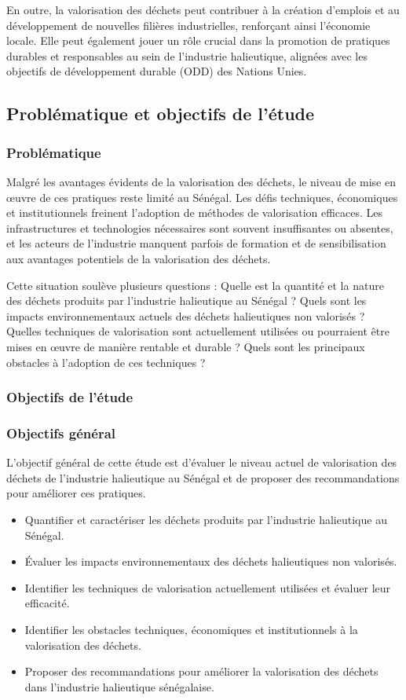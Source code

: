 \documentclass[12pt,a4paper]{report}
\begin{document}
En outre, la valorisation des déchets peut contribuer à la création d'emplois et au développement de nouvelles filières industrielles, renforçant ainsi l'économie locale. Elle peut également jouer un rôle crucial dans la promotion de pratiques durables et responsables au sein de l'industrie halieutique, alignées avec les objectifs de développement durable (ODD) des Nations Unies.

\subsection*{Problématique et objectifs de l'étude}
\subsubsection*{Problématique}
Malgré les avantages évidents de la valorisation des déchets, le niveau de mise en œuvre de ces pratiques reste limité au Sénégal. Les défis techniques, économiques et institutionnels freinent l'adoption de méthodes de valorisation efficaces. Les infrastructures et technologies nécessaires sont souvent insuffisantes ou absentes, et les acteurs de l'industrie manquent parfois de formation et de sensibilisation aux avantages potentiels de la valorisation des déchets.

Cette situation soulève plusieurs questions : Quelle est la quantité et la nature des déchets produits par l'industrie halieutique au Sénégal ? Quels sont les impacts environnementaux actuels des déchets halieutiques non valorisés ? Quelles techniques de valorisation sont actuellement utilisées ou pourraient être mises en œuvre de manière rentable et durable ? Quels sont les principaux obstacles à l'adoption de ces techniques ? 

\subsubsection*{Objectifs de l'étude}
\subsubsection*{Objectifs général}
L'objectif général de cette étude est d'évaluer le niveau actuel de valorisation des déchets de l'industrie halieutique au Sénégal et de proposer des recommandations pour améliorer ces pratiques. 

\begin{itemize}
    \item Quantifier et caractériser les déchets produits par l'industrie halieutique au Sénégal.
    \item Évaluer les impacts environnementaux des déchets halieutiques non valorisés.
    \item Identifier les techniques de valorisation actuellement utilisées et évaluer leur efficacité.
    \item Identifier les obstacles techniques, économiques et institutionnels à la valorisation des déchets.
    \item Proposer des recommandations pour améliorer la valorisation des déchets dans l'industrie halieutique sénégalaise.
\end{itemize}
\end{document}
